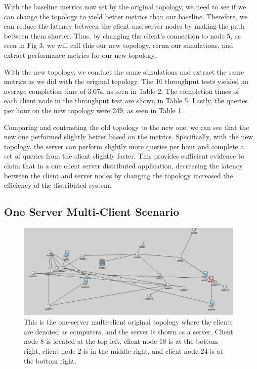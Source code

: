 	With the baseline metrics now set by the original topology, we need to see if we can change the topology to yield better metrics than our baseline. Therefore, we can reduce the latency between the client and server nodes by making the path between them shorter. Thus, by changing the client's connection to node 5, as seen in Fig 3, we will call this our new topology, rerun our simulations, and extract performance metrics for our new topology.

	With the new topology, we conduct the same simulations and extract the same metrics as we did with the original topology. The 10 throughput tests yielded an average completion time of 3.07s, as seen in Table 2. The completion times of each client node in the throughput test are shown in Table 5. Lastly, the queries per hour on the new topology were 249, as seen in Table 1.

	Comparing and contrasting the old topology to the new one, we can see that the new one performed slightly better based on the metrics. Specifically, with the new topology, the server can perform slightly more queries per hour and complete a set of queries from the client slightly faster. This provides sufficient evidence to claim that in a one client server distributed application, decreasing the latency between the client and server nodes by changing the topology increased the efficiency of the distributed system.



\subsection{One Server Multi-Client Scenario}

\begin{figure}[tp]
\centering
\includegraphics[width=0.5 \textwidth]{figures/MultClientOrig}
\caption{This is the one-server multi-client original topology where the clients are denoted as computers, and the server is shown as a server. Client node 8 is located at the top left, client node 18 is at the bottom right, client node 2 is in the middle right, and client node 24 is at the bottom right.
}
\end{figure}

